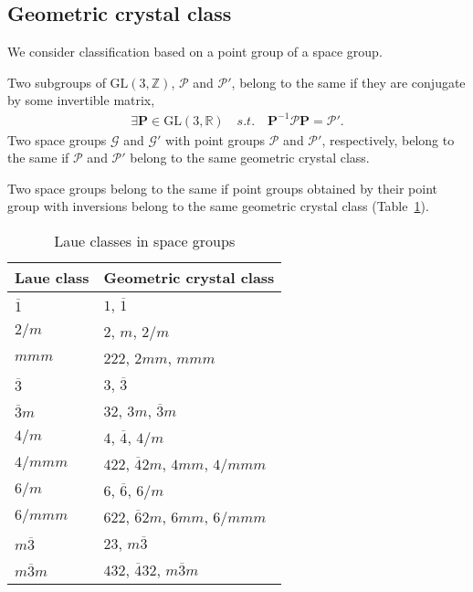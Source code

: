 \subsection{\label{sec:geometric-class}Geometric crystal class}

We consider classification based on a point group of a space group.

\begin{screen}
  \begin{definition}
    Two subgroups of $\mathrm{GL}(3, \mathbb{Z})$, $\mathcal{P}$ and $\mathcal{P}'$, belong to the same  if they are conjugate by some invertible matrix,
    \begin{align}
      \exists \bm{P} \in \mathrm{GL}(3, \mathbb{R}) \quad s.t. \quad \bm{P}^{-1} \mathcal{P} \bm{P} = \mathcal{P}'.
    \end{align}
    Two space groups $\mathcal{G}$ and $\mathcal{G}'$ with point groups $\mathcal{P}$ and $\mathcal{P}'$, respectively, belong to the same  if $\mathcal{P}$ and $\mathcal{P}'$ belong to the same geometric crystal class.
  \end{definition}
\end{screen}

Two space groups belong to the same  if point groups obtained by their point group with inversions belong to the same geometric crystal class (Table~\ref{tab:laue_class}).

\begin{table}[tb]
  \centering
  \caption{Laue classes in space groups}
  \label{tab:laue_class}
  \begin{tabular}[h]{l|l}
    \hline
    Laue class       & Geometric crystal class \\ \hline
    $\overline{1}$   & $1$, $\overline{1}$ \\
    $2/m$            & $2$, $m$, $2/m$ \\
    $mmm$            & $222$, $2mm$, $mmm$ \\
    $\overline{3}$   & $3$, $\overline{3}$ \\
    $\overline{3}m$  & $32$, $3m$, $\overline{3}m$ \\
    $4/m$            & $4$, $\overline{4}$, $4/m$ \\
    $4/mmm$          & $422$, $\overline{4}2m$, $4mm$, $4/mmm$ \\
    $6/m$            & $6$, $\overline{6}$, $6/m$ \\
    $6/mmm$          & $622$, $\overline{6}2m$, $6mm$, $6/mmm$ \\
    $m\overline{3}$  & $23$, $m\overline{3}$ \\
    $m\overline{3}m$ & $432$, $\overline{4}32$, $m\overline{3}m$ \\ \hline
  \end{tabular}
\end{table}


